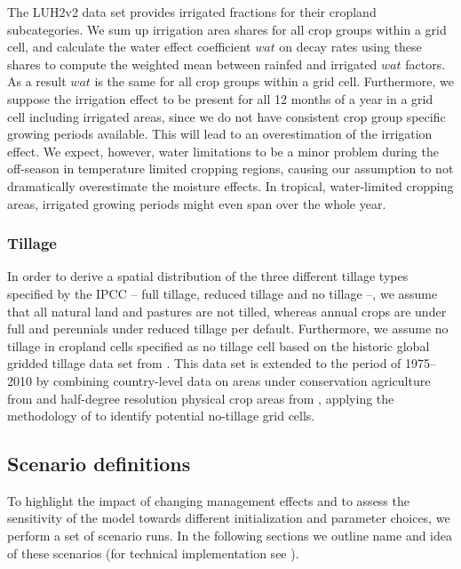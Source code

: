 \documentclass[gc, manuscript]{copernicus}
\begin{document}
The LUH2v2 \citep{hurtt_harmonization_2020} data set provides irrigated fractions for their cropland subcategories. We sum up irrigation area shares for all crop groups within a grid cell, and calculate the water effect coefficient \(wat\) on decay rates using these shares to compute the weighted mean between rainfed and irrigated \(wat\) factors. As a result \(wat\) is the same for all crop groups within a grid cell. Furthermore, we suppose the irrigation effect to be present for all 12 months of a year in a grid cell including irrigated areas, since we do not have consistent crop group specific growing periods available. This will lead to an overestimation of the irrigation effect. We expect, however, water limitations to be a minor problem during the off-season in temperature limited cropping regions, causing our assumption to not dramatically overestimate the moisture effects. In tropical, water-limited cropping areas, irrigated growing periods might even span over the whole year.

\hypertarget{sec:tillage}{%
\subsubsection{Tillage}\label{sec:tillage}}

In order to derive a spatial distribution of the three different tillage types specified by the IPCC -- full tillage, reduced tillage and no tillage --, we assume that all natural land and pastures are not tilled, whereas annual crops are under full and perennials under reduced tillage per default. Furthermore, we assume no tillage in cropland cells specified as no tillage cell based on the historic global gridded tillage data set from \citep{porwollik_generating_2018}. This data set is extended to the period of 1975--2010 by combining country-level data on areas under conservation agriculture from \citep{fao_aquastat_2016} and half-degree resolution physical crop areas from \citep{hurtt_harmonization_2020}, applying the methodology of \citep{porwollik_generating_2018} to identify potential no-tillage grid cells.

\hypertarget{sec:scenarios}{%
\subsection{Scenario definitions}\label{sec:scenarios}}

To highlight the impact of changing management effects and to assess the sensitivity of the model towards different initialization and parameter choices, we perform a set of scenario runs. In the following sections we outline name and idea of these scenarios (for technical implementation see \citep{karstens_mrsoil_2020}).
\end{document}

